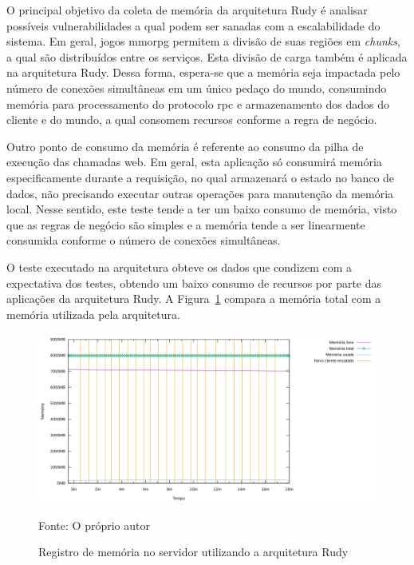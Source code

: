 O principal objetivo da coleta de memória da arquitetura Rudy é analisar possíveis vulnerabilidades a qual podem ser sanadas com a escalabilidade do sistema.
%
Em geral, jogos \ac{mmorpg} permitem a divisão de suas regiões em \textit{chunks}, a qual são distribuídos entre os serviços.
%
Esta divisão de carga também é aplicada na arquitetura Rudy.
%
Dessa forma, espera-se que a memória seja impactada pelo número de conexões simultâneas em um único pedaço do mundo, consumindo memória para processamento do protocolo \ac{rpc} e armazenamento dos dados do cliente e do mundo, a qual consomem recursos conforme a regra de negócio.

Outro ponto de consumo da memória é referente ao consumo da pilha de execução das chamadas web. Em geral, esta aplicação só consumirá memória especificamente durante a requisição, no qual armazenará o estado no banco de dados, não precisando executar outras operações para manutenção da memória local.
%
Nesse sentido, este teste tende a ter um baixo consumo de memória, visto que as regras de negócio são simples e a memória tende a ser linearmente consumida conforme o número de conexões simultâneas.

O teste executado na arquitetura obteve os dados que condizem com a expectativa dos testes, obtendo um baixo consumo de recursos por parte das aplicações da arquitetura Rudy.
%
A Figura~\ref{fig:rudy_t4_memory} compara a memória total com a memória utilizada pela arquitetura.

\begin{figure}[htb!]
    \caption{Registro de memória no servidor utilizando a arquitetura Rudy}
    \label{fig:rudy_t4_memory}
    \includegraphics[width=\textwidth]{metricas_rudy_t4/memory.png}
    \centering
    
    Fonte: O próprio autor
\end{figure}

